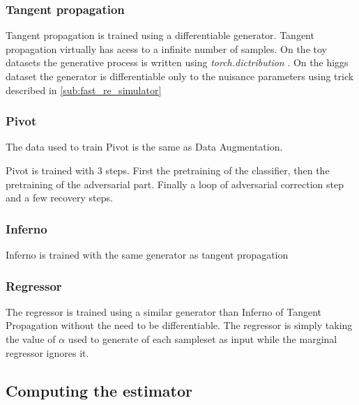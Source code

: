 \subsubsection{Tangent propagation} %
\label{ssub:tangent_propagation}

Tangent propagation is trained using a differentiable generator.
Tangent propagation virtually has acess to a infinite number of samples.
On the toy datasets the generative process is written using \emph{torch.dictribution} .
On the higgs dataset the generator is differentiable only to the nuisance parameters using trick described in \autoref{sub:fast_re_simulator} 




\subsubsection{Pivot} %
\label{ssub:pivot}


The data used to train Pivot is the same as Data Augmentation.

Pivot is trained with 3 steps.
First the pretraining of the classifier, then the pretraining of the adversarial part.
Finally a loop of adversarial correction step and a few recovery steps.




\subsubsection{Inferno} %
\label{ssub:inferno}

Inferno is trained with the same generator as tangent propagation




\subsubsection{Regressor} %
\label{ssub:regressor}

The regressor is trained using a similar generator than Inferno of Tangent Propagation without the need to be differentiable.
The regressor is simply taking the value of $\alpha$ used to generate of each sampleset as input while the marginal regressor ignores it.






\subsection{Computing the estimator} %
\label{sub:computing_the_estimator}

